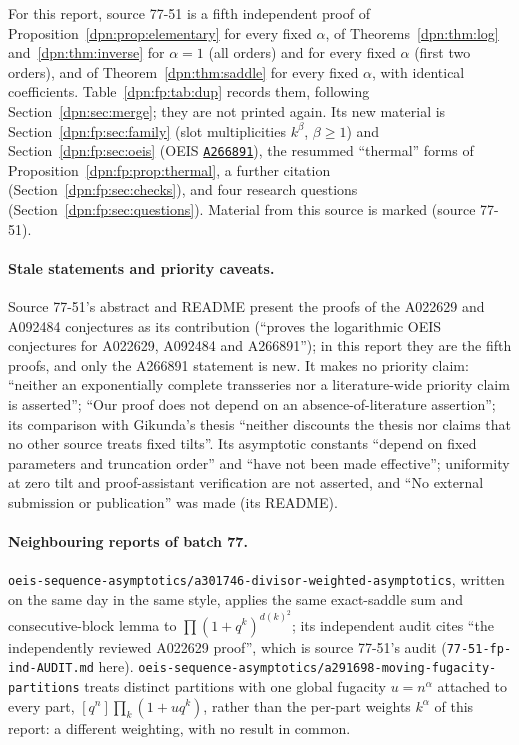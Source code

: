 \documentclass[11pt]{article}
\numberwithin{equation}{section}
\theoremstyle{definition}\newtheorem{definition}[theorem]{Definition}
\theoremstyle{remark}\newtheorem{remark}[theorem]{Remark}
\newcommand{\OEIS}[1]{\href{https://oeis.org/#1}{\texttt{#1}}}
\newcommand{\src}[1]{\textup{(source #1)}}
\newcommand{\file}[1]{\nolinkurl{#1}}
\begin{document}
For this report, source 77-51 is a fifth independent proof of
Proposition~\ref{dpn:prop:elementary} for every fixed $\alpha$, of
Theorems~\ref{dpn:thm:log} and~\ref{dpn:thm:inverse} for $\alpha=1$ (all
orders) and for every fixed $\alpha$ (first two orders), and of
Theorem~\ref{dpn:thm:saddle} for every fixed $\alpha$, with identical
coefficients.  Table~\ref{dpn:fp:tab:dup} records them, following
Section~\ref{dpn:sec:merge}; they are not printed again.  Its new material is
Section~\ref{dpn:fp:sec:family} (slot multiplicities $k^\beta$, $\beta\ge1$)
and Section~\ref{dpn:fp:sec:oeis} (OEIS \OEIS{A266891}), the resummed
``thermal'' forms of Proposition~\ref{dpn:fp:prop:thermal}, a further
citation (Section~\ref{dpn:fp:sec:checks}), and four research questions
(Section~\ref{dpn:fp:sec:questions}).  Material from this source is marked
\src{77-51}.

\paragraph{Stale statements and priority caveats.}
Source 77-51's abstract and README present the proofs of the A022629 and
A092484 conjectures as its contribution (``proves the logarithmic OEIS
conjectures for A022629, A092484 and A266891''); in this report they are the
fifth proofs, and only the A266891 statement is new.  It makes no priority
claim: ``neither an exponentially complete transseries nor a literature-wide
priority claim is asserted''; ``Our proof does not depend on an
absence-of-literature assertion''; its comparison with Gikunda's thesis
``neither discounts the thesis nor claims that no other source treats fixed
tilts''.  Its asymptotic constants ``depend on fixed parameters and
truncation order'' and ``have not been made effective''; uniformity at zero
tilt and proof-assistant verification are not asserted, and ``No external
submission or publication'' was made (its README).

\paragraph{Neighbouring reports of batch 77.}
\file{oeis-sequence-asymptotics/a301746-divisor-weighted-asymptotics}, written
on the same day in the same style, applies the same exact-saddle sum and
consecutive-block lemma to $\prod(1+q^k)^{d(k)^2}$; its independent audit
cites ``the independently reviewed A022629 proof'', which is source 77-51's
audit (\file{77-51-fp-ind-AUDIT.md} here).
\file{oeis-sequence-asymptotics/a291698-moving-fugacity-partitions} treats
distinct partitions with one global fugacity $u=n^\alpha$ attached to every
part, $[q^n]\prod_k(1+uq^k)$, rather than the per-part weights $k^\alpha$ of
this report: a different weighting, with no result in common.
\end{document}
